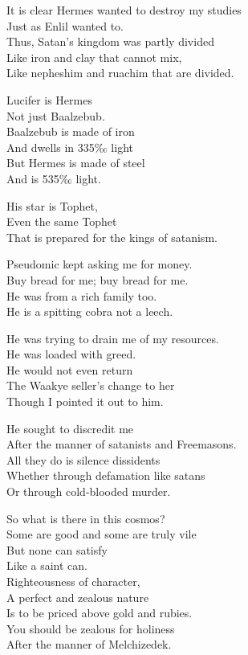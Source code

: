 \documentclass[
]{book}
\begin{document}
It is clear Hermes wanted to destroy my studies\\
Just as Enlil wanted to.\\
Thus, Satan's kingdom was partly divided\\
Like iron and clay that cannot mix,\\
Like nepheshim and ruachim that are divided.

Lucifer is Hermes\\
Not just Baalzebub.\\
Baalzebub is made of iron\\
And dwells in 335‰ light\\
But Hermes is made of steel\\
And is 535‰ light.

His star is Tophet,\\
Even the same Tophet\\
That is prepared for the kings of satanism.

Pseudomic kept asking me for money.\\
Buy bread for me; buy bread for me.\\
He was from a rich family too.\\
He is a spitting cobra not a leech.

He was trying to drain me of my resources.\\
He was loaded with greed.\\
He would not even return\\
The Waakye seller's change to her\\
Though I pointed it out to him.

He sought to discredit me\\
After the manner of satanists and Freemasons.\\
All they do is silence dissidents\\
Whether through defamation like satans\\
Or through cold-blooded murder.

So what is there in this cosmos?\\
Some are good and some are truly vile\\
But none can satisfy\\
Like a saint can.\\

Righteousness of character,\\
A perfect and zealous nature\\
Is to be priced above gold and rubies.\\
You should be zealous for holiness\\
After the manner of Melchizedek.
\end{document}
